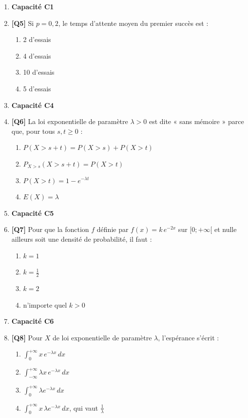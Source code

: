 \begin{enumerate}
\item[] \textbf{Capacité C1}

\item \textbf{[Q5]} Si $p = 0{,}2$, le temps d'attente moyen du premier succès est :
  \begin{enumerate}[label=\Alph*.]
    \item 2 d'essais
    \item 4 d'essais
    \item 10 d'essais
    \item 5 d'essais
  \end{enumerate}

\item[] \textbf{Capacité C4}

\item \textbf{[Q6]} La loi exponentielle de paramètre $\lambda>0$ est dite « sans mémoire » parce que, pour tous $s,t\geq0$ :
  \begin{enumerate}[label=\Alph*.]
    \item $P(X>s+t)=P(X>s)+P(X>t)$
    \item $P_{X>s}(X>s+t)=P(X>t)$
    \item $P(X>t)=1-e^{-\lambda t}$
    \item $E(X)=\lambda$
  \end{enumerate}

\item[] \textbf{Capacité C5}

\item \textbf{[Q7]} Pour que la fonction $f$ définie par $f(x)=k\,e^{-2x}$ sur $[0;+\infty[$ et nulle ailleurs soit une densité de probabilité, il faut :
  \begin{enumerate}[label=\Alph*.]
    \item $k=1$
    \item $k=\tfrac12$
    \item $k=2$
    \item n'importe quel $k>0$
  \end{enumerate}

\item[] \textbf{Capacité C6}

\item \textbf{[Q8]} Pour $X$ de loi exponentielle de paramètre $\lambda$, l'espérance s'écrit :
  \begin{enumerate}[label=\Alph*.]
    \item $\displaystyle\int_0^{+\infty} x\,e^{-\lambda x}\,dx$
    \item $\displaystyle\int_{-\infty}^{+\infty} \lambda x\,e^{-\lambda x}\,dx$
    \item $\displaystyle\int_0^{+\infty} \lambda e^{-\lambda x}\,dx$
    \item $\displaystyle\int_0^{+\infty} x\,\lambda e^{-\lambda x}\,dx$, qui vaut $\tfrac1\lambda$
  \end{enumerate}


\end{enumerate}
